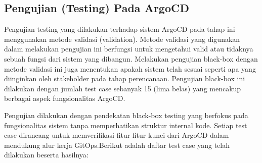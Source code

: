 \subsection{Pengujian (Testing) Pada ArgoCD}\label{sec:bab4_pengujian}
Pengujian testing yang dilakukan terhadap sistem ArgoCD pada tahap ini
menggunakan metode validasi (validation). Metode validasi yang digunakan dalam
melakukan pengujian ini berfungsi untuk mengetahui valid atau tidaknya sebuah
fungsi dari sistem yang dibangun. Melakukan pengujian black-box dengan metode
validasi ini juga menentukan apakah sistem telah sesuai seperti apa yang
diinginkan oleh stakeholder pada tahap perencanaan. Pengujian black-box ini
dilakukan dengan jumlah test case sebanyak 15 (lima belas) yang mencakup
berbagai aspek fungsionalitas ArgoCD.

Pengujian dilakukan dengan pendekatan black-box testing yang berfokus pada
fungsionalitas sistem tanpa memperhatikan struktur internal kode. Setiap test
case dirancang untuk memverifikasi fitur-fitur kunci dari ArgoCD dalam
mendukung alur kerja GitOps.Berikut adalah daftar test case yang telah
dilakukan beserta hasilnya:

